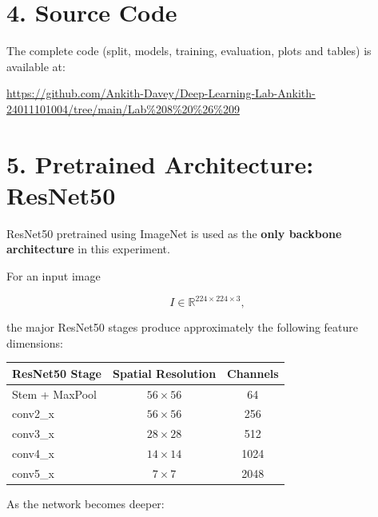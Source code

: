 \documentclass[10pt]{article}
\begin{document}
\section*{4. Source Code}

The complete code (split, models, training, evaluation, plots and tables) is available at:

{\small\url{https://github.com/Ankith-Davey/Deep-Learning-Lab-Ankith-24011101004/tree/main/Lab%208%20%26%209}}

\section*{5. Pretrained Architecture: ResNet50}

ResNet50 pretrained using ImageNet is used as the
\textbf{only backbone architecture} in this experiment.

For an input image

\[
I\in\mathbb{R}^{224\times224\times3},
\]

the major ResNet50 stages produce approximately the following feature
dimensions:

\begin{center}

\begin{tabular}{|l|c|c|}
\hline
\textbf{ResNet50 Stage}
&
\textbf{Spatial Resolution}
&
\textbf{Channels}
\\
\hline

Stem + MaxPool
&
$56\times56$
&
64
\\
\hline

conv2\_x
&
$56\times56$
&
256
\\
\hline

conv3\_x
&
$28\times28$
&
512
\\
\hline

conv4\_x
&
$14\times14$
&
1024
\\
\hline

conv5\_x
&
$7\times7$
&
2048
\\
\hline

\end{tabular}

\end{center}

As the network becomes deeper:
\end{document}
